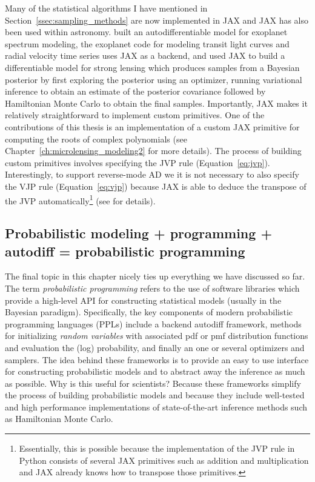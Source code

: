 \documentclass[12pt,dvipsnames]{report}
\newcommand{\ssf}[1]{\textsf{#1}}
\begin{document}
Many of the statistical algorithms I have mentioned  in 
Section~\ref{ssec:sampling_methods} are now implemented in \ssf{JAX} and 
\ssf{JAX} has also been used within astronomy. \citet{2022ApJS..258...31K} built 
an autodifferentiable model for exoplanet spectrum modeling, 
the \ssf{exoplanet} code \citet{2021JOSS....6.3285F} for modeling transit light 
curves and radial velocity time series uses \ssf{JAX} as a backend, and 
\citet{2022arXiv220207663G} used \ssf{JAX} to build a differentiable model 
for strong lensing  which produces samples from a Bayesian posterior by  first
exploring the posterior using an optimizer, running variational inference to 
obtain an estimate of the posterior covariance followed by Hamiltonian Monte Carlo
to obtain the final samples. Importantly, \ssf{JAX} makes it relatively 
straightforward to implement custom primitives. One of the contributions of this 
thesis is an implementation of a custom JAX primitive for computing the roots 
of complex polynomials (see Chapter~\ref{ch:microlensing_modeling2} for more details).
The process of building custom primitives involves specifying the JVP rule 
(Equation~\ref{eq:jvp}). Interestingly, to support reverse-mode AD we it is 
not necessary to also specify the VJP rule (Equation~\ref{eq:vjp}) because 
\ssf{JAX} is able to deduce the transpose of the JVP automatically\footnote{
    Essentially, this is possible because the implementation of the JVP rule 
    in \ssf{Python} consists of several \ssf{JAX} primitives such as addition
    and multiplication and \ssf{JAX} already knows how to transpose those 
    primitives.} (see \citet{arXiv:2105.09469} for details). 

\subsection{Probabilistic modeling + programming + autodiff = probabilistic programming}
The final topic in this chapter nicely ties up everything we have discussed so far.
The term \textsl{probabilistic programming} refers to the use of software libraries 
which  provide a high-level API for constructing statistical models (usually in 
the Bayesian paradigm). Specifically, 
the key components of modern probabilistic programming languages (PPLs) include a backend
autodiff framework, methods for initializing \emph{random variables} with 
associated pdf or pmf distribution functions and evaluation the (log) probability, 
and finally an one or several optimizers and samplers. The idea behind these 
frameworks is to provide an easy to use interface for constructing probabilistic 
models and to abstract away the inference as much as possible.
Why is this useful for scientists? Because these frameworks simplify the process  
of building probabilistic  models and because they include well-tested and high
performance implementations of state-of-the-art inference methods such as 
Hamiltonian Monte Carlo. 
\end{document}

